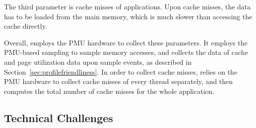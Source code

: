 The third parameter is cache misses of applications. Upon cache misses, the data has to be loaded from the main memory, which is much slower than accessing the cache directly. 

Overall, \MP{} employs the PMU hardware to collect these parameters. It employs the PMU-based sampling to sample memory accesses, and collects the data of cache and page utilization data upon sample events, as described in Section~\ref{sec:profilefriendliness}. In order to collect cache misses, \MP{} relies on the PMU hardware to collect cache misses of every thread separately, and then computes the total number of cache misses for the whole application.





\subsection{Technical Challenges}

